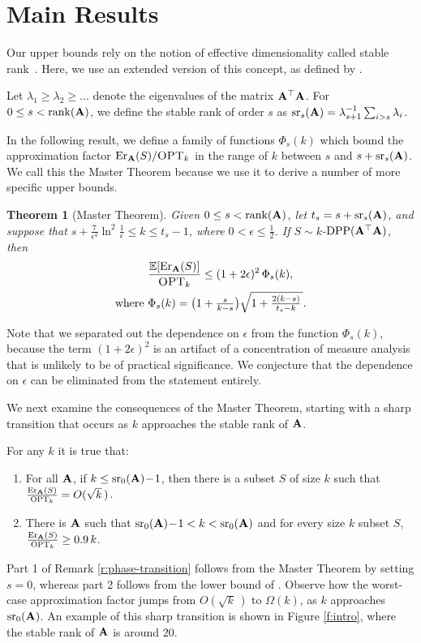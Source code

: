 \documentclass{article}
\newtheorem{theorem}{Theorem}
\begin{document}
\section{Main Results}
Our upper bounds rely on the notion of effective dimensionality called
stable rank~\citep{ridge-leverage-scores}. Here, we use an extended version of this concept, as
defined by \citet{BLLT19_TR}.
\begin{definition}
Let $\lambda_1\geq \lambda_2\geq ...$ denote the eigenvalues of the
matrix $\mathbf A^\top\mathbf A$. For  $0\leq s<\mathrm{rank}(\mathbf A)$, we define the stable
rank of order $s$ as ${\mathrm{sr}}_s(\mathbf A) = \lambda_{s+1}^{-1}\sum_{i>s}\lambda_i$.
\end{definition}
In the following result, we define a family of functions $\Phi_s(k)$ which
bound the approximation factor $\mathrm{Er}_\mathbf A(S)/{\textsc{OPT}_k}$ in the range of $k$ between $s$ and
$s+{\mathrm{sr}}_s(\mathbf A)$. We call this the Master Theorem because we use it to derive
a number of more specific upper bounds.
\begin{theorem}[Master Theorem]\label{t:upper}
Given $0\leq s<\mathrm{rank}(\mathbf A) $, let  $t_s = s+{\mathrm{sr}}_s(\mathbf A)$,
and suppose that $s+ \frac7{\epsilon^4}\ln^2\!\frac1\epsilon \leq k\leq t_s-1$,
where $0<\epsilon\leq\frac12$. If $S\sim k$-${\mathrm{DPP}}(\mathbf A^\top\mathbf A)$, then
\begin{align*}
  &\frac{\mathbb E[\mathrm{Er}_\mathbf A(S)]}{{\textsc{OPT}_k}}\leq (1+2\epsilon)^2\,\Phi_{s}(k),\\
  \text{where }& \Phi_s(k)=\big(1+\tfrac{s}{k-s}\big)\sqrt{1 + \tfrac{2(k-s)}{t_s-k}\,}.
\end{align*}
\end{theorem}
Note that we separated out the dependence on $\epsilon$ from the function
$\Phi_s(k)$, because the term $(1+2\epsilon)^2$ is an artifact of a
concentration of measure analysis that is unlikely to be of practical
significance. We conjecture that the dependence on $\epsilon$
can be eliminated from the statement entirely.%

We next examine the consequences of
the Master Theorem, starting with a sharp transition that occurs as $k$
approaches the stable rank of $\mathbf A$. 
\begin{remark}\label{r:phase-transition}
For any $k$ it is true that:
  \begin{enumerate}
\item  For all $\mathbf A$, if $k\leq {\mathrm{sr}}_0(\mathbf A)\!-\!1$, then there is a subset $S$ of size $k$ such that
$\frac{\mathrm{Er}_\mathbf A(S)}{{\textsc{OPT}_k}} = O(\sqrt  k\,)$.
\item There is $\mathbf A$ such that ${\mathrm{sr}}_0(\mathbf A)\!-\!1<k<{\mathrm{sr}}_0(\mathbf A)$ and for
  every size $k$ subset $S$, $\frac{\mathrm{Er}_\mathbf A(S)}{{\textsc{OPT}_k}}
  \geq 0.9\,k$.
  \end{enumerate}
\end{remark}
Part 1 of Remark \ref{r:phase-transition} follows from the Master Theorem by setting
$s=0$, whereas part 2 follows from the lower bound of
\citet{more-efficient-volume-sampling}. Observe how the worst-case
approximation factor jumps from $O(\sqrt k\,)$ to $\Omega(k)$, as $k$
approaches ${\mathrm{sr}}_0(\mathbf A)$. An example of this sharp
transition is shown in Figure \ref{f:intro}, where the stable
rank of $\mathbf A$ is around $20$. 
\end{document}
